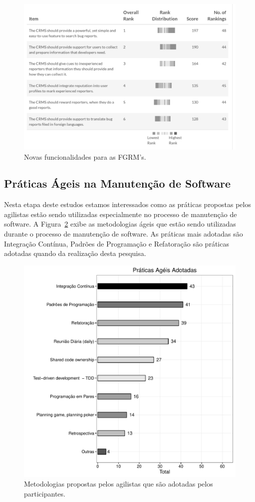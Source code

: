 \begin{figure}[htpb]
	\centering
	\includegraphics[width=0.8\linewidth]{./chapter-pesquisa-com-profissionais/img/grafico_melhorias_fgrm_melhorias.pdf}
	\caption{Novas funcionalidades para as FGRM's.}
	\label{fig:ggrafico_melhorias_fgrm_melhorias}
\end{figure}


\subsection{Práticas Ágeis na Manutenção de Software}
\label{sub:práticas_ágeis_na_manutenção_de_software}

Nesta etapa deste estudos estamos interessados como as práticas propostas pelos
agilistas estão sendo utilizadas especialmente no processo de manutenção de
software. A Figura~\ref{fig:grafico_melhorias_fgrm_praticas_ageis_adotadas}
exibe as metodologias ágeis que estão sendo utilizadas durante o processo de
manutenção de software. As práticas mais adotadas são Integração Contínua,
Padrões de Programação e Refatoração são práticas adotadas quando da realização
desta pesquisa. 

\begin{figure}[htpb]
	\centering
	\includegraphics[width=0.8\linewidth]{./chapter-pesquisa-com-profissionais/img/grafico_melhorias_fgrm_praticas_ageis_adotadas.pdf}
	\caption{Metodologias propostas pelos agilistas que são adotadas pelos
		participantes.}
	\label{fig:grafico_melhorias_fgrm_praticas_ageis_adotadas}
\end{figure}

